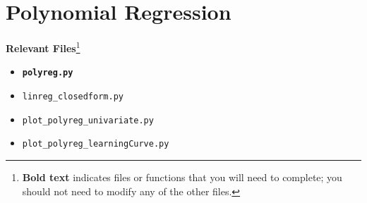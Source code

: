 \documentclass{article}
\begin{document}
\section*{Polynomial Regression}
{\bf Relevant Files}\footnote{{\bf Bold text} indicates files or functions that you will need to complete; you should not need to modify any of the other files.}
\vspace{-1.2em}
\begin{multicols}{2}
    \begin{itemize}[noitemsep,nolistsep]
        \item \texttt{\bf polyreg.py}
        \item \texttt{linreg\_closedform.py}
        \item \texttt{plot\_polyreg\_univariate.py}
        \item \texttt{plot\_polyreg\_learningCurve.py}
    \end{itemize}
\end{multicols}
\end{document}
